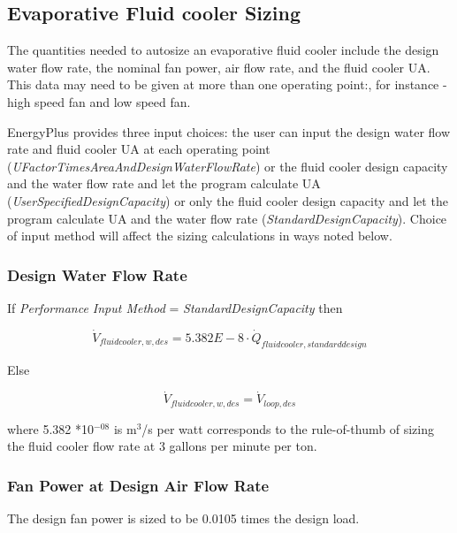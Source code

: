 \subsection{Evaporative Fluid cooler Sizing}\label{evaporative-fluid-cooler-sizing}

The quantities needed to autosize an evaporative fluid cooler include the design water flow rate, the nominal fan power, air flow rate, and the fluid cooler UA. This data may need to be given at more than one operating point:, for instance - high speed fan and low speed fan.

EnergyPlus provides three input choices: the user can input the design water flow rate and fluid cooler UA at each operating point (\emph{UFactorTimesAreaAndDesignWaterFlowRate}) or the fluid cooler design capacity and the water flow rate and let the program calculate UA (\emph{UserSpecifiedDesignCapacity}) or only the fluid cooler design capacity and let the program calculate UA and the water flow rate (\emph{StandardDesignCapacity}). Choice of input method will affect the sizing calculations in ways noted below.

\subsubsection{Design Water Flow Rate}\label{design-water-flow-rate-2}

If \emph{Performance Input Method} = \emph{StandardDesignCapacity} then

\begin{equation}
{\dot V_{fluidcooler,w,des}} = 5.382E - 8\cdot {\dot Q_{fluidcooler,standarddesign}}
\end{equation}

Else

\begin{equation}
{\dot V_{fluidcooler,w,des}} = {\dot V_{loop,des}}
\end{equation}

where 5.382 *10\(^{-08}\) is m\(^{3}\)/s per watt corresponds to the rule-of-thumb of sizing the fluid cooler flow rate at 3 gallons per minute per ton.

\subsubsection{Fan Power at Design Air Flow Rate}\label{fan-power-at-design-air-flow-rate-2}

The design fan power is sized to be 0.0105 times the design load.

